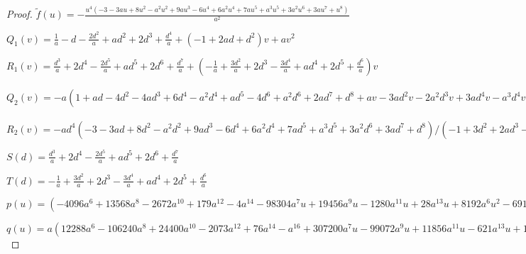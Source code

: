 \documentclass{gtpart}
\theoremstyle{definition}
\theoremstyle{remark}
\newcommand{\Tf}{\widetilde{f}}
\begin{document}
\begin{proof}
$\Tf(u) = -\frac{u^4 (-3 - 3 a u + 8 u^2 - a^2 u^2 + 9 a u^3 - 6 u^4 + 6 a^2 u^4 + 
    7 a u^5 + a^3 u^5 + 3 a^2 u^6 + 3 a u^7 + u^8)}{a^2}$

$Q_1(v) = \frac{1}{a} - d - \frac{2 d^2}{a} + a d^2 + 2 d^3 + \frac{d^4}{a} + (-1 + 2 a d + d^2) v + 
 a v^2$

$R_1(v) = \frac{d^3}{a} + 2 d^4 - \frac{2 d^5}{a} + a d^5 + 
 2 d^6 + \frac{d^7}{a} + (-\frac{1}{a} + \frac{3 d^2}{a} + 2 d^3 - \frac{3 d^4}{a} + a d^4 + 
    2 d^5 + \frac{d^6}{a}) v$

$Q_2(v) = -a (1 + a d - 4 d^2 - 4 a d^3 + 6 d^4 - a^2 d^4 + a d^5 - 4 d^6 + 
    a^2 d^6 + 2 a d^7 + d^8 + a v - 3 a d^2 v - 2 a^2 d^3 v + 
    3 a d^4 v - a^3 d^4 v - 2 a^2 d^5 v - a d^6 v) / (-1 + 3 d^2 + 
   2 a d^3 - 3 d^4 + a^2 d^4 + 2 a d^5 + d^6)^2$

$R_2(v) = -a d^4 (-3 - 3 a d + 8 d^2 - a^2 d^2 + 9 a d^3 - 6 d^4 + 
    6 a^2 d^4 + 7 a d^5 + a^3 d^5 + 3 a^2 d^6 + 3 a d^7 + d^8) / (-1 + 
   3 d^2 + 2 a d^3 - 3 d^4 + a^2 d^4 + 2 a d^5 + d^6)^2$

$S(d) = \frac{d^3}{a} + 2 d^4 - \frac{2 d^5}{a} + a d^5 + 
 2 d^6 + \frac{d^7}{a}$

$T(d) = -\frac{1}{a} + \frac{3 d^2}{a} + 2 d^3 - \frac{3 d^4}{a} + a d^4 + 
    2 d^5 + \frac{d^6}{a}$

$p(u) = (-4096 a^6 + 13568 a^8 - 2672 a^{10} + 179 a^{12} - 
  4 a^{14} - 98304 a^7 u + 19456 a^9 u - 1280 a^{11} u + 28 a^{13} u + 
  8192 a^6 u^2 - 69120 a^8 u^2 + 17248 a^{10} u^2 - 1610 a^{12} u^2 + 
  66 a^{14} u^2 - a^{16} u^2 + 77824 a^7 u^3 - 41984 a^9 u^3 + 
  6384 a^{11} u^3 - 382 a^{13} u^3 + 8 a^{15} u^3 - 4096 a^6 u^4 - 
  55040 a^8 u^4 + 11792 a^{10} u^4 - 825 a^{12} u^4 + 19 a^{14} u^4 - 
  28672 a^7 u^5 + 6144 a^9 u^5 - 432 a^{11} u^5 + 10 a^{13} u^5) / (65536 a^8 - 16384 a^{10} + 1536 a^{12} - 
 64 a^{14} + a^{16})$

$q(u) = a (12288 a^6 - 106240 a^8 + 24400 a^{10} - 2073 a^{12} + 
   76 a^{14} - a^{16} + 307200 a^7 u - 99072 a^9 u + 11856 a^{11} u - 
   621 a^{13} u + 12 a^{15} u - 20480 a^6 u^2 + 296192 a^8 u^2 - 
   71856 a^{10} u^2 + 6555 a^{12} u^2 - 265 a^{14} u^2 + 4 a^{16} u^2 - 
   135168 a^7 u^3 + 199680 a^9 u^3 - 40272 a^{11} u^3 + 3082 a^{13} u^3 - 
   98 a^{15} u^3 + a^{17} u^3 + 4096 a^6 u^4 + 213760 a^8 u^4 - 
   22928 a^{10} u^4 - 1435 a^{12} u^4 + 239 a^{14} u^4 - 7 a^{16} u^4 + 
   12288 a^7 u^5 + 78592 a^9 u^5 - 16880 a^{11} u^5 + 1177 a^{13} u^5 - 
   27 a^{15} u^5 + 4096 a^6 u^6 + 83712 a^8 u^6 - 17936 a^{10} u^6 + 
   1257 a^{12} u^6 - 29 a^{14} u^6 + 28672 a^7 u^7 - 6144 a^9 u^7 + 
   432 a^{11} u^7 - 10 a^{13} u^7) / (65536 a^8 - 16384 a^{10} + 1536 a^{12} - 
 64 a^{14} + a^{16})$
\end{proof}
\end{document}

